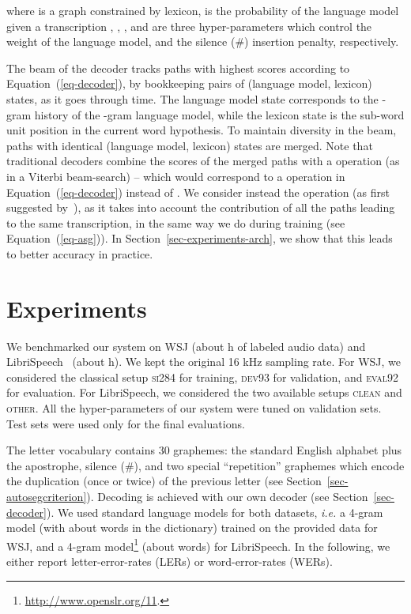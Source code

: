 \documentclass{article}
\begin{document}
where  is a graph constrained by lexicon,
 is the probability of the language model given a
transcription , , , and  are three
hyper-parameters which control the weight of the language model, 
and the silence (\#) insertion penalty, respectively.

The beam of the decoder tracks paths with highest scores according to
Equation~(\ref{eq-decoder}), by bookkeeping pairs of (language model,
lexicon) states, as it goes through time. The language model state
corresponds to the -gram history of the -gram language model,
while the lexicon state is the sub-word unit position in the current word
hypothesis. To maintain diversity in the beam, paths with identical
(language model, lexicon) states are merged. Note that traditional decoders
combine the scores of the merged paths with a  operation (as
in a Viterbi beam-search) -- which would correspond to a 
operation in Equation~(\ref{eq-decoder}) instead of .  We
consider instead the  operation (as first suggested
by~\cite{bottou1991phd}), as it takes into account the contribution of all
the paths leading to the same transcription, in the same way we do during
training (see Equation~(\ref{eq-asg})). In
Section~\ref{sec-experiments-arch}, we show that this leads to better
accuracy in practice.


\section{Experiments}

We benchmarked our system on WSJ (about h of labeled audio data) and
LibriSpeech~\citep{panayotov2015librispeech} (about h). We kept the
original 16 kHz sampling rate. For WSJ, we considered the classical setup
\textsc{si284} for training, \textsc{dev93} for validation, and
\textsc{eval92} for evaluation.  For LibriSpeech, we considered the two
available setups \textsc{clean} and \textsc{other}. All the
hyper-parameters of our system were tuned on validation sets. Test sets
were used only for the final evaluations.

The letter vocabulary  contains 30 graphemes: the standard
English alphabet plus the apostrophe, silence (\textsc{\small \#}), and two
special ``repetition'' graphemes which encode the duplication (once or
twice) of the previous letter (see
Section~\ref{sec-autosegcriterion}). Decoding is achieved with our own
decoder (see Section~\ref{sec-decoder}). We used standard language models
for both datasets, \emph{i.e.} a 4-gram model (with about  words in
the dictionary) trained on the provided data for WSJ, and a 4-gram
model\footnote{\url{http://www.openslr.org/11}.}  (about  words) for
LibriSpeech. In the following, we either report letter-error-rates (LERs)
or word-error-rates (WERs).
\end{document}
